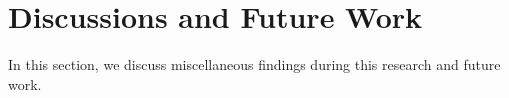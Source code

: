\chapter{Discussions and Future Work}
\label{sec:discussion_future_work}

In this section, we discuss miscellaneous findings during this research and future work.







